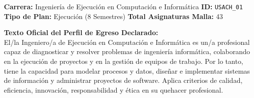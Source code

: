 \documentclass[11pt,a4paper]{article}
\begin{document}
\begin{tcolorbox}[fichaStyle, title={UNIVERSIDAD 01: Universidad de Santiago de Chile (USACH) --- Ejecución}]
\small\sffamily
\textbf{Carrera:} Ingeniería de Ejecución en Computación e Informática \hfill \textbf{ID:} \texttt{USACH\_01} \\
\textbf{Tipo de Plan:} Ejecución (8 Semestres) \hfill \textbf{Total Asignaturas Malla:} 43

\tcbline

\textbf{Texto Oficial del Perfil de Egreso Declarado:}\\[4pt]
{\small\rmfamily
El/la Ingeniero/a de Ejecución en Computación e Informática es un/a profesional capaz de diagnosticar y resolver problemas de ingeniería informática, colaborando en la ejecución de proyectos y en la gestión de equipos de trabajo. Por lo tanto, tiene la capacidad para modelar procesos y datos, diseñar e implementar sistemas de información y administrar proyectos de software. Aplica criterios de calidad, eficiencia, innovación, responsabilidad y ética en su quehacer profesional.
}
\end{tcolorbox}

\vspace{10pt}
\end{document}
